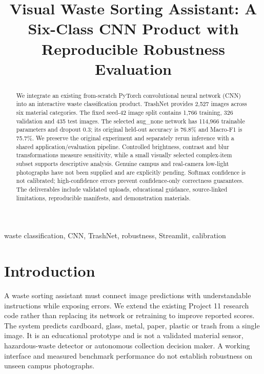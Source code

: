 \documentclass[conference]{IEEEtran}
\title{Visual Waste Sorting Assistant: A Six-Class CNN Product with Reproducible Robustness Evaluation}
\author{\IEEEauthorblockN{Project 11}\IEEEauthorblockA{Final Milestone Technical Report}}
\begin{document}
\maketitle
\begin{abstract}
We integrate an existing from-scratch PyTorch convolutional neural network (CNN) into an interactive waste classification product. TrashNet provides 2,527 images across six material categories. The fixed seed-42 image split contains 1,766 training, 326 validation and 435 test images. The selected aug\_none network has 114,966 trainable parameters and dropout 0.3; its original held-out accuracy is 76.8\% and Macro-F1 is 75.7\%. We preserve the original experiment and separately rerun inference with a shared application/evaluation pipeline. Controlled brightness, contrast and blur transformations measure sensitivity, while a small visually selected complex-item subset supports descriptive analysis. Genuine campus and real-camera low-light photographs have not been supplied and are explicitly pending. Softmax confidence is not calibrated; high-confidence errors prevent confidence-only correctness guarantees. The deliverables include validated uploads, educational guidance, source-linked limitations, reproducible manifests, and demonstration materials.
\end{abstract}
\begin{IEEEkeywords}waste classification, CNN, TrashNet, robustness, Streamlit, calibration\end{IEEEkeywords}

\section{Introduction}
A waste sorting assistant must connect image predictions with understandable instructions while exposing errors. We extend the existing Project 11 research code rather than replacing its network or retraining to improve reported scores. The system predicts cardboard, glass, metal, paper, plastic or trash from a single image. It is an educational prototype and is not a validated material sensor, hazardous-waste detector or autonomous collection decision maker. A working interface and measured benchmark performance do not establish robustness on unseen campus photographs.
\end{document}
